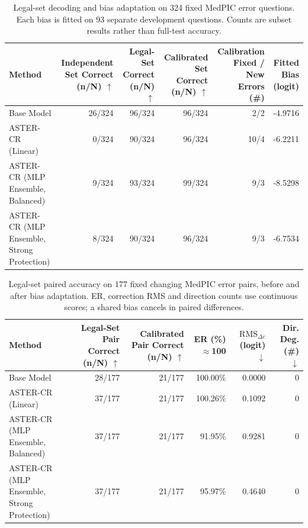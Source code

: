\begin{table}[t]
\centering
\small
\setlength{\tabcolsep}{3pt}
\begin{tabularx}{\textwidth}{@{}>{\raggedright\arraybackslash}Xrrrrr@{}}
\toprule
Method & \shortstack{Independent Set Correct\\ (n/N) $\uparrow$} & \shortstack{Legal-Set Correct\\ (n/N) $\uparrow$} & \shortstack{Calibrated Set Correct\\ (n/N) $\uparrow$} & \shortstack{Calibration Fixed / New Errors\\ (\#)} & \shortstack{Fitted Bias\\ (logit)} \\
\midrule
Base Model & 26/324 & 96/324 & 96/324 & 2/2 & -4.9716 \\
ASTER-CR (Linear) & 0/324 & 90/324 & 96/324 & 10/4 & -6.2211 \\
ASTER-CR (MLP Ensemble, Balanced) & 9/324 & 93/324 & 99/324 & 9/3 & -8.5298 \\
ASTER-CR (MLP Ensemble, Strong Protection) & 8/324 & 90/324 & 96/324 & 9/3 & -6.7534 \\
\bottomrule
\end{tabularx}
\caption{Legal-set decoding and bias adaptation on 324 fixed MedPIC error questions. Each bias is fitted on 93 separate development questions. Counts are subset results rather than full-test accuracy.}
\label{tab:aster-main-11}
\end{table}

\begin{table}[t]
\centering
\small
\setlength{\tabcolsep}{3pt}
\begin{tabularx}{\textwidth}{@{}>{\raggedright\arraybackslash}Xrrrrr@{}}
\toprule
Method & \shortstack{Legal-Set Pair Correct\\ (n/N) $\uparrow$} & \shortstack{Calibrated Pair Correct\\ (n/N) $\uparrow$} & \shortstack{ER\\ (\%) $\approx$100} & \shortstack{$\mathrm{RMS}_{\Delta c}$\\ (logit) $\downarrow$} & \shortstack{Dir. Deg.\\ (\#) $\downarrow$} \\
\midrule
Base Model & 28/177 & 21/177 & 100.00\% & 0.0000 & 0 \\
ASTER-CR (Linear) & 37/177 & 21/177 & 100.26\% & 0.1092 & 0 \\
ASTER-CR (MLP Ensemble, Balanced) & 37/177 & 21/177 & 91.95\% & 0.9281 & 0 \\
ASTER-CR (MLP Ensemble, Strong Protection) & 37/177 & 21/177 & 95.97\% & 0.4640 & 0 \\
\bottomrule
\end{tabularx}
\caption{Legal-set paired accuracy on 177 fixed changing MedPIC error pairs, before and after bias adaptation. ER, correction RMS and direction counts use continuous scores; a shared bias cancels in paired differences.}
\label{tab:aster-main-12}
\end{table}


